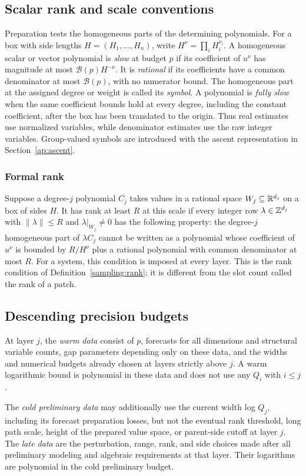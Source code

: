 \subsection{Scalar rank and scale conventions}\label{ap:scalar-conventions}

Preparation tests the homogeneous parts of the determining polynomials.
For a box with side lengths $H=(H_1,\ldots,H_n)$, write
$H^\nu=\prod_iH_i^{\nu_i}$. A homogeneous scalar or vector
polynomial is \emph{slow} at budget $p$ if its coefficient of
$u^\nu$ has magnitude at most $\mathcal B(p)H^{-\nu}$.
It is \emph{rational} if its coefficients have a common denominator
at most $\mathcal B(p)$, with no numerator bound. The homogeneous
part at the assigned degree or weight is called its \emph{symbol}.
A polynomial is \emph{fully slow} when the same coefficient bounds
hold at every degree, including the constant coefficient, after the
box has been translated to the origin. Thus real estimates use
normalized variables, while denominator estimates use the raw
integer variables. Group-valued symbols are introduced with the
ascent representation in Section~\ref{ap:ascent}.

\subsubsection{Formal rank}\label{ap:rank-conventions}
Suppose a degree-$j$ polynomial $C_j$ takes values in a rational
space $W_j\subseteq\mathbb R^{d_j}$ on a box of sides $H$.
It has rank at least $R$ at this scale if every integer row
$\lambda\in\mathbb Z^{d_j}$ with $\|\lambda\|\le R$ and
$\lambda|_{W_j}\ne0$ has the following property: the degree-$j$
homogeneous part of $\lambda C_j$ cannot be written as a polynomial
whose coefficient of $u^\nu$ is bounded by $R/H^\nu$ plus a
rational polynomial with common denominator at most $R$.
For a system, this condition is imposed at every layer.
This is the rank condition of Definition~\ref{sampling:rank};
it is different from the slot count called the rank of a patch.

\subsection{Descending precision budgets}

\begin{definition}\label{ap:budgets}
At layer $j$, the \emph{warm data} consist of $p$, forecasts for all
dimensions and structural variable counts, gap parameters depending
only on these data, and the widths and numerical budgets already
chosen at layers strictly above $j$. A warm logarithmic bound is
polynomial in these data and does not use any $Q_i$ with $i\le j$.

The \emph{cold preliminary data} may additionally use the current
width log $Q_j$, including its forecast preparation losses, but not
the eventual rank threshold, long path scale, height of the prepared
value space, or parent-side cutoff at layer $j$. The \emph{late data}
are the perturbation, range, rank, and side choices made after all
preliminary modeling and algebraic requirements at that layer.
Their logarithms are polynomial in the cold preliminary budget.
\end{definition}

